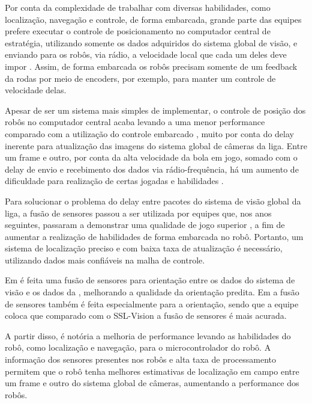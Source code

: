 \documentclass[acronym, symbols, table, deposito]{fei}
\begin{document}
				Por conta da complexidade de trabalhar com diversas habilidades, como localização, navegação e controle, de forma embarcada, grande parte das equipes prefere executar o controle de posicionamento no computador central de estratégia, utilizando somente os dados adquiridos do sistema global de visão, e enviando para os robôs, via rádio, a velocidade local que cada um deles deve impor \cite{ubc_thunderbots_2015, immortals_2023}. Assim, de forma embarcada os robôs precisam somente de um feedback da rodas por meio de encoders, por exemplo, para manter um controle de velocidade delas.
				
				Apesar de ser um sistema mais simples de implementar, o controle de posição dos robôs no computador central acaba levando a uma menor performance comparado com a utilização do controle embarcado \cite{ubc_thunderbots_2015}, muito por conta do delay inerente para atualização das imagens do sistema global de câmeras da liga. Entre um frame e outro, por conta da alta velocidade da bola em jogo, somado com o delay de envio e recebimento dos dados via rádio-frequência, há um aumento de dificuldade para realização de certas jogadas e habilidades \cite{immortals_2023}.
				
				Para solucionar o problema do delay entre pacotes do sistema de visão global da liga, a fusão de sensores passou a ser utilizada por equipes que, nos anos seguintes, passaram a demonstrar uma qualidade de jogo superior \cite{zjunlict_2018, tigers_2013, ubc_thunderbots_2015, ubc_thunderbots_2017, immortals_2023, parsian_2015}, a fim de aumentar a realização de habilidades de forma embarcada no robô. Portanto, um sistema de localização preciso e com baixa taxa de atualização é necessário, utilizando dados mais confiáveis na malha de controle.
				
				Em \textcite{immortals_2023} é feita uma fusão de sensores para orientação entre os dados do sistema de visão e os dados da , melhorando a qualidade da orientação predita. Em \textcite{parsian_2019} a fusão de sensores também é feita especialmente para a orientação, sendo que a equipe coloca que comparado com o SSL-Vision a fusão de sensores é mais acurada.
				
				A partir disso, é notória a melhoria de performance levando as habilidades do robô, como localização e navegação, para o microcontrolador do robô. A informação dos sensores presentes nos robôs e alta taxa de processamento permitem que o robô tenha melhores estimativas de localização em campo entre um frame e outro do sistema global de câmeras, aumentando a performance dos robôs.
		
\end{document}
